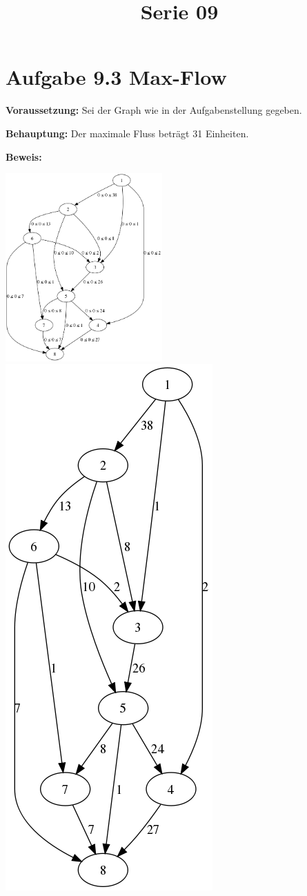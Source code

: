  
\title{Serie 09}

 

  \section*{Aufgabe 9.3 Max-Flow}
  \textbf{Voraussetzung: } Sei der Graph wie in der Aufgabenstellung gegeben.
  
  \noindent
  \textbf{Behauptung: } Der maximale Fluss beträgt 31 Einheiten.
  
  \noindent
  \textbf{Beweis: }
  
  \includegraphics[width=0.45\textwidth]{img/0-graph.png}
  \includegraphics[height=0.6\textwidth]{img/0-res-graph.png}
  
